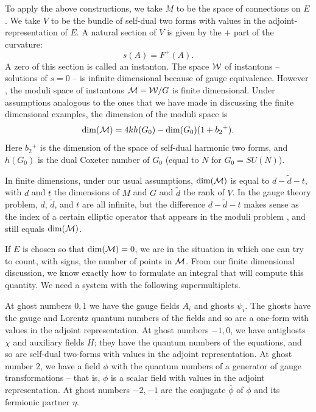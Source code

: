 \documentclass[12pt]{article}
\numberwithin{equation}{section}
\def\tilde{\widetilde}
\def\bar{\overline}
\begin{document}
To apply the above constructions, we take $M$ to be the space of connections
on $E$.  We take $V$ to be the bundle of self-dual two forms with
values in the adjoint-representation of $E$.  A natural section
of $V$ is given by the $+$ part of the curvature:
\begin{equation}
  \label{natsection}
  s(A)= F^+(A).
\end{equation}
A zero of this section is called an instanton.
The space ${\cal W}$ of instantons -- solutions of $s=0$ -- is
infinite dimensional because of gauge equivalence.  However \cite{ahs},
the moduli space of instantons ${\cal M}={\cal W}/G$ is finite
dimensional.  Under assumptions analogous to the ones that we have
made in discussing the finite dimensional examples, the dimension
of the moduli space is \cite{ahs}
\begin{equation}
  \label{dimm}
  {\rm dim}({\cal M})=4k h(G_0)-{\rm dim}(G_0)(1+b_2{}^+).
\end{equation}
Here $b_2{}^+$ is the dimension of the space of self-dual harmonic
two forms, and $h(G_0)$ is the dual Coxeter number of $G_0$ (equal to $N$ for
$G_0=SU(N)$).

In finite dimensions, under our usual assumptions, ${\dim({\cal M})}$
is equal to $d-\tilde d -t$,  with $d$ and $t$ the dimensions
of $M$ and $G$ and $\tilde d$ the rank of $V$.  In the gauge theory
problem, $d$, $\tilde d$, and $t$ are all infinite, but
the difference $d-\tilde d-t$ makes sense as the index of a certain
elliptic operator that appears in the moduli problem \cite{ahs},
and still equals $\dim({\cal M})$.

If $E$ is chosen so that ${\rm dim}({\cal M})=0$, we are in the
situation in which one can try to count, with signs, the number of
points in ${\cal M}$.  From our finite dimensional
discussion, we know exactly how to formulate an integral that
will compute this quantity.
We need a system with the following supermultiplets.

At ghost numbers $0,1$ we have the gauge fields $A_i$ and
ghosts $\psi_i$.  The ghosts have the gauge and Lorentz
quantum numbers of the fields
and so are a one-form with values in the adjoint representation.
At ghost numbers $-1,0$, we have antighosts
$\chi$ and auxiliary fields $H$; they have the quantum numbers of the
equations, and so are self-dual two-forms with values in the adjoint
representation.
At ghost number $2$, we have a field $\phi$ with the quantum numbers
of a generator of gauge transformations -- that is, $\phi$ is a scalar
field with values in the adjoint representation.
At ghost numbers $-2,-1$ are the conjugate $\bar\phi$ of $\phi$
and its fermionic partner $\eta$.
\end{document}
